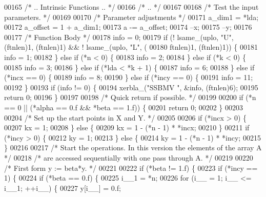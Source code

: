 \begin{DoxyCode}
00165 \textcolor{comment}{/*     .. Intrinsic Functions .. */}
00166 \textcolor{comment}{/*     .. */}
00167 
00168 \textcolor{comment}{/*     Test the input parameters. */}
00169 
00170     \textcolor{comment}{/* Parameter adjustments */}
00171     a\_dim1 = *lda;
00172     a\_offset = 1 + a\_dim1;
00173     a -= a\_offset;
00174     --x;
00175     --y;
00176 
00177     \textcolor{comment}{/* Function Body */}
00178     info = 0;
00179     \textcolor{keywordflow}{if} (! lsame\_(uplo, \textcolor{stringliteral}{"U"}, (ftnlen)1, (ftnlen)1) && ! lsame\_(uplo, \textcolor{stringliteral}{"L"}, (
00180         ftnlen)1, (ftnlen)1)) \{
00181     info = 1;
00182     \} \textcolor{keywordflow}{else} \textcolor{keywordflow}{if} (*n < 0) \{
00183     info = 2;
00184     \} \textcolor{keywordflow}{else} \textcolor{keywordflow}{if} (*k < 0) \{
00185     info = 3;
00186     \} \textcolor{keywordflow}{else} \textcolor{keywordflow}{if} (*lda < *k + 1) \{
00187     info = 6;
00188     \} \textcolor{keywordflow}{else} \textcolor{keywordflow}{if} (*incx == 0) \{
00189     info = 8;
00190     \} \textcolor{keywordflow}{else} \textcolor{keywordflow}{if} (*incy == 0) \{
00191     info = 11;
00192     \}
00193     \textcolor{keywordflow}{if} (info != 0) \{
00194     xerbla\_(\textcolor{stringliteral}{"SSBMV "}, &info, (ftnlen)6);
00195     \textcolor{keywordflow}{return} 0;
00196     \}
00197 
00198 \textcolor{comment}{/*     Quick return if possible. */}
00199 
00200     \textcolor{keywordflow}{if} (*n == 0 || (*alpha == 0.f && *beta == 1.f)) \{
00201     \textcolor{keywordflow}{return} 0;
00202     \}
00203 
00204 \textcolor{comment}{/*     Set up the start points in  X  and  Y. */}
00205 
00206     \textcolor{keywordflow}{if} (*incx > 0) \{
00207     kx = 1;
00208     \} \textcolor{keywordflow}{else} \{
00209     kx = 1 - (*n - 1) * *incx;
00210     \}
00211     \textcolor{keywordflow}{if} (*incy > 0) \{
00212     ky = 1;
00213     \} \textcolor{keywordflow}{else} \{
00214     ky = 1 - (*n - 1) * *incy;
00215     \}
00216 
00217 \textcolor{comment}{/*     Start the operations. In this version the elements of the array A */}
00218 \textcolor{comment}{/*     are accessed sequentially with one pass through A. */}
00219 
00220 \textcolor{comment}{/*     First form  y := beta*y. */}
00221 
00222     \textcolor{keywordflow}{if} (*beta != 1.f) \{
00223     \textcolor{keywordflow}{if} (*incy == 1) \{
00224         \textcolor{keywordflow}{if} (*beta == 0.f) \{
00225         i\_\_1 = *n;
00226         \textcolor{keywordflow}{for} (i\_\_ = 1; i\_\_ <= i\_\_1; ++i\_\_) \{
00227             y[i\_\_] = 0.f;

\end{DoxyCode}
